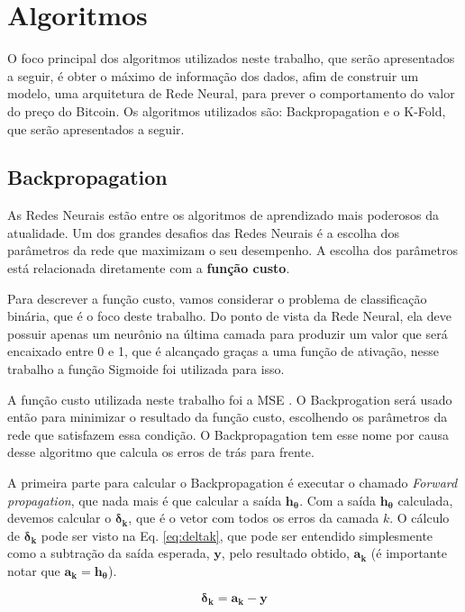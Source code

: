 \section{Algoritmos}

O foco principal dos algoritmos utilizados neste trabalho, que serão apresentados a seguir, é obter o máximo de informação dos dados, afim de construir um modelo, uma arquitetura de Rede Neural, para prever o comportamento do valor do preço do Bitcoin. Os algoritmos utilizados são: Backpropagation e o K-Fold, que serão apresentados a seguir.
 
\subsection{Backpropagation}
\label{subsec:backpropagation}

 As Redes Neurais estão entre os algoritmos de aprendizado mais poderosos da atualidade. Um dos grandes desafios das Redes Neurais é a escolha dos parâmetros da rede que maximizam o seu desempenho. A escolha dos parâmetros está relacionada diretamente com a \textbf{função custo}.
 
 Para descrever a função custo, vamos considerar o problema de classificação binária, que é o foco deste trabalho. Do ponto de vista da Rede Neural, ela deve possuir apenas um neurônio na última camada para produzir um valor que será encaixado entre 0 e 1, que é alcançado graças a uma função de ativação, nesse trabalho a função Sigmoide foi utilizada para isso.
 
 A função custo utilizada neste trabalho foi a MSE \cite{lehmann2006theory}. O Backprogation será usado então para minimizar o resultado da função custo, escolhendo os parâmetros da rede que satisfazem essa condição. O Backpropagation tem esse nome por causa desse algoritmo que calcula os erros de trás para frente.
 
 A primeira parte para calcular o Backpropagation é executar o chamado \textit{Forward propagation}, que nada mais é que calcular a saída $\mathbf{h_\theta}$. Com a saída $\mathbf{h_\theta}$ calculada, devemos calcular o $\mathbf{\delta_k}$, que é o vetor com todos os erros da camada $k$. O cálculo de $\mathbf{\delta_k}$ pode ser visto na Eq. \ref{eq:deltak}, que pode ser entendido simplesmente como a subtração da saída esperada,  $\mathbf{y}$, pelo resultado obtido, $\mathbf{a_k}$ (é importante notar que $\mathbf{a_k} = \mathbf{h_\theta}$). 
 
\begin{equation}
\label{eq:deltak}
\mathbf{\delta_k} = \mathbf{a_k} - \mathbf{y}
\end{equation}

